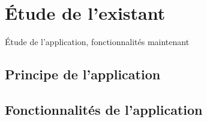 \chapter{Étude de l’existant  }

Étude de l'application, fonctionnalités maintenant 

    \section{Principe de l'application}

    \section{Fonctionnalités de l'application}